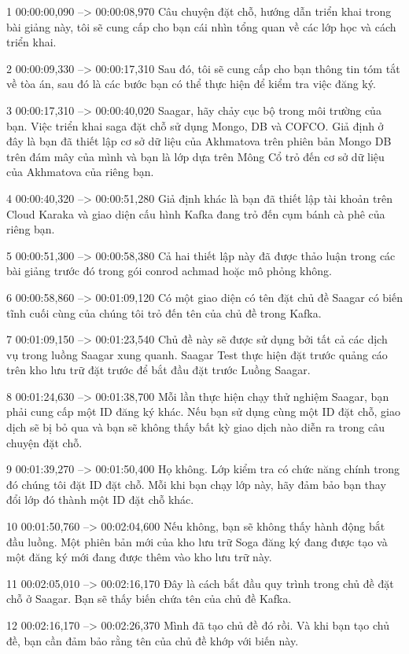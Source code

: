 1
00:00:00,090 --> 00:00:08,970
Câu chuyện đặt chỗ, hướng dẫn triển khai trong bài giảng này, tôi sẽ cung cấp cho bạn cái nhìn tổng quan về các lớp học và cách triển khai.

2
00:00:09,330 --> 00:00:17,310
Sau đó, tôi sẽ cung cấp cho bạn thông tin tóm tắt về tòa án, sau đó là các bước bạn có thể thực hiện để kiểm tra việc đăng ký.

3
00:00:17,310 --> 00:00:40,020
Saagar, hãy chảy cục bộ trong môi trường của bạn.  Việc triển khai saga đặt chỗ sử dụng Mongo, DB và COFCO.  Giả định ở đây là bạn đã thiết lập cơ sở dữ liệu của Akhmatova trên phiên bản Mongo DB trên đám mây của mình và bạn là lớp dựa trên Mông Cổ trỏ đến cơ sở dữ liệu của Akhmatova của riêng bạn.

4
00:00:40,320 --> 00:00:51,280
Giả định khác là bạn đã thiết lập tài khoản trên Cloud Karaka và giao diện cấu hình Kafka đang trỏ đến cụm bánh cà phê của riêng bạn.

5
00:00:51,300 --> 00:00:58,380
Cả hai thiết lập này đã được thảo luận trong các bài giảng trước đó trong gói conrod achmad hoặc mô phỏng không.

6
00:00:58,860 --> 00:01:09,120
Có một giao diện có tên đặt chủ đề Saagar có biến tĩnh cuối cùng của chúng tôi trỏ đến tên của chủ đề trong Kafka.

7
00:01:09,150 --> 00:01:23,540
Chủ đề này sẽ được sử dụng bởi tất cả các dịch vụ trong luồng Saagar xung quanh.  Saagar Test thực hiện đặt trước quảng cáo trên kho lưu trữ đặt trước để bắt đầu đặt trước Luồng Saagar.

8
00:01:24,630 --> 00:01:38,700
Mỗi lần thực hiện chạy thử nghiệm Saagar, bạn phải cung cấp một ID đăng ký khác.  Nếu bạn sử dụng cùng một ID đặt chỗ, giao dịch sẽ bị bỏ qua và bạn sẽ không thấy bất kỳ giao dịch nào diễn ra trong câu chuyện đặt chỗ.

9
00:01:39,270 --> 00:01:50,400
Họ không.  Lớp kiểm tra có chức năng chính trong đó chúng tôi đặt ID đặt chỗ.  Mỗi khi bạn chạy lớp này, hãy đảm bảo bạn thay đổi lớp đó thành một ID đặt chỗ khác.

10
00:01:50,760 --> 00:02:04,600
Nếu không, bạn sẽ không thấy hành động bắt đầu luồng.  Một phiên bản mới của kho lưu trữ Soga đăng ký đang được tạo và một đăng ký mới đang được thêm vào kho lưu trữ này.

11
00:02:05,010 --> 00:02:16,170
Đây là cách bắt đầu quy trình trong chủ đề đặt chỗ ở Saagar.  Bạn sẽ thấy biến chứa tên của chủ đề Kafka.

12
00:02:16,170 --> 00:02:26,370
Mình đã tạo chủ đề đó rồi.  Và khi bạn tạo chủ đề, bạn cần đảm bảo rằng tên của chủ đề khớp với biến này.

